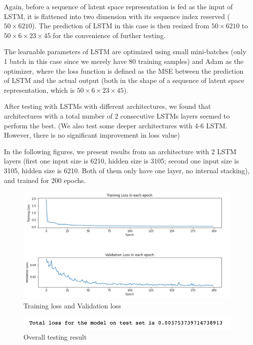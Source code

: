 Again, before a sequence of latent space representation is fed as the input of LSTM, it is flattened into two dimension with its sequence index reserved ($50 \times 6210$). The prediction of LSTM in this case is then resized from $50 \times 6210$ to $50 \times 6 \times 23 \times 45$ for the convenience of further testing.

The learnable parameters of LSTM are optimized using small mini-batches (only 1 batch in this case since we merely have 80 training samples) and Adam as the optimizer, where the loss function is defined as the MSE between the prediction of LSTM and the actual output (both in the shape of a sequence of latent space representation, which is $50 \times 6 \times 23 \times 45$).

After testing with LSTMs with different architectures, we found that architectures with a total number of 2 consecutive LSTMs layers seemed to perform the best. (We also test some deeper architectures with 4-6 LSTM. However, there is no significant improvement in loss value)

In the following figures, we present results from an architecture with 2 LSTM layers (first one input size is 6210, hidden size is 3105; second one input size is 3105, hidden size is 6210. Both of them only have one layer, no internal stacking), and trained for 200 epochs.

\begin{figure}[H]
    \caption{Training loss and Validation loss}
    \includegraphics[scale=0.6]{Report LaTeX/figures/mantle_convection_images/limited_dataset/LSTM_trainingData.png}
\end{figure}

\begin{figure}[H]
    \caption{Overall testing result}
    \includegraphics[scale=0.8]{Report LaTeX/figures/mantle_convection_images/limited_dataset/LSTM_OverallTesting.png}
\end{figure}

